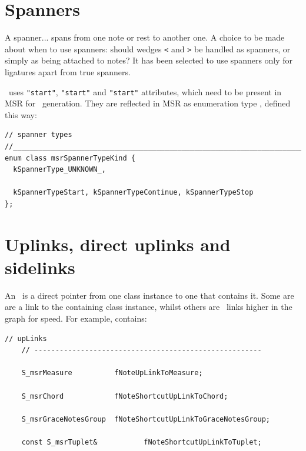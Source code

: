 

\section{Spanners}\label{Spanners}

A spanner... spans from one note or rest to another one. A choice to be made about when to use spanners: should
wedges {\tt <} and {\tt >} be handled as spanners, or simply as being attached to notes? It has been selected to use spanners only for ligatures apart from true spanners.

\mxml\ uses {\tt "start"}, {\tt "start"} and {\tt "start"} attributes, which need to be present in MSR for \mxml\ generation. They are reflected in MSR as enumeration type , defined this way:
\begin{lstlisting}[language=CPlusPlus]
// spanner types
//______________________________________________________________________________
enum class msrSpannerTypeKind {
  kSpannerType_UNKNOWN_,

  kSpannerTypeStart, kSpannerTypeContinue, kSpannerTypeStop
};
\end{lstlisting}


\section{Uplinks, direct uplinks and sidelinks}\label{Uplinks, direct uplinks and sidelinks}

An \upLink\ is a direct pointer from one class instance to one that contains it. Some are are a link to the containing class instance, whilst others are \shortcut\ links higher in the graph for speed. For example,  contains:
\begin{lstlisting}[language=CPlusPlus]
    // upLinks
    // ------------------------------------------------------

    S_msrMeasure          fNoteUpLinkToMeasure;

    S_msrChord            fNoteShortcutUpLinkToChord;

    S_msrGraceNotesGroup  fNoteShortcutUpLinkToGraceNotesGroup;

    const S_msrTuplet&           fNoteShortcutUpLinkToTuplet;
\end{lstlisting}


